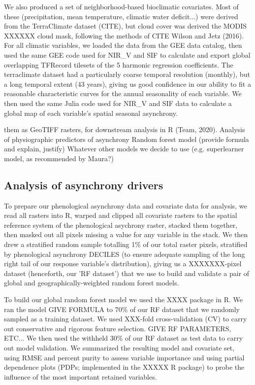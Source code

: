 \documentclass[12pt]{article}
\begin{document}
We also produced a set of neighborhood-based bioclimatic covariates.
Most of these (precipitation, mean temperature, climatic water deficit...) were derived from the TerraClimate dataset (CITE),
but cloud cover was derived the MODIS XXXXXX cloud mask, following
the methods of CITE Wilson and Jetz (2016).
For all climatic variables, we loaded the data from the GEE data catalog,
then used the same GEE code used for NIR_{V} and SIF to calculate
and export global overlapping TFRecord tilesets of the 5 harmonic regression
coefficients. The terraclimate dataset had a particularly coarse temporal resolution (monthly), but a long temporal extent (43 years), giving us good confidence in our ability to fit a reasonable characteristic curves for the annual seasonality of each variable.
We then used the same Julia code used for NIR_{V} and SIF data to calculate
a global map of each variable's spatial seasonal asynchrony.

them as GeoTIFF rasters, for downstream analysis in R (Team, 2020).
Analysis of physiographic predictors of asynchrony
Random forest model (provide formula and explain, justify)
Whatever other models we decide to use (e.g. superlearner model, as
recommended by Maura?)


\subsection*{Analysis of asynchrony drivers}

To prepare our phenological asynchrony data and covariate data for analysis, we read all
rasters into R, warped and clipped all covariate rasters to the
spatial reference system of the phenological asychrony raster, stacked them together,
then masked out all pixels missing a value for any variable in the stack.
We then drew a stratified random sample totalling 1\% of our total raster pixels,
stratified by phenological asynchrony DECILES (to ensure adequate sampling of
the long right tail of our response variable's distribution), giving us
a XXXXXXX-pixel dataset (henceforth, our 'RF dataset') that we use to build and validate a pair of global
and geographically-weighted random forest models.

To build our global random forest model we used the XXXX package in R. We ran
the model 
        GIVE FORMULA
to 70\% of our RF dataset that we randomly sampled as a training dataset.
We used XXX-fold cross-validation (CV) to carry out conservative and rigorous
feature selection. GIVE RF PARAMETERS, ETC... We then used the withheld 30\% of our
RF dataset as test data to carry out model validation. We summarized the resulting model
and covariate set, using RMSE and percent purity to assess variable
importance and using partial dependence plots (PDPs; implemented in the XXXXX R package)
to probe the influence of the most important retained variables.
\end{document}
